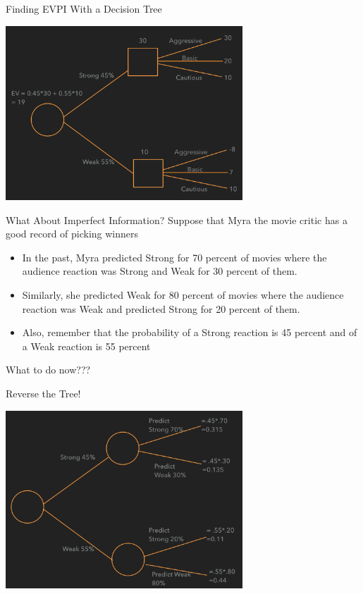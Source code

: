 \documentclass{beamer}\usepackage[]{graphicx}\usepackage[]{color}
\begin{document}
\begin{darkframes}
\begin{frame}[fragile]{Finding EVPI With a Decision Tree}
        \begin{center}
        \includegraphics[width=3.5in]{BevoPerfectInfo} 
        \end{center}
    
    \lc %
    \end{frame}  


    \begin{frame}[fragile]{What About Imperfect Information?}
      Suppose that Myra the movie critic has a good record of picking winners
      \begin{itemize} [<+->]
        \item In the past, Myra predicted Strong for 70 percent of movies where the audience reaction was Strong and Weak for 30 percent of them.
        \item Similarly, she predicted Weak for 80 percent of movies where the audience reaction was Weak and predicted Strong for 20 percent of them.
        \item Also, remember that the probability of a Strong reaction is 45 percent and of a Weak reaction is 55 percent
      \end{itemize}

      \pause
      What to do now???

      \lc %
    \end{frame}


    \begin{frame}[fragile]{Reverse the Tree!}

      \begin{center}
        \includegraphics[width=3.5in]{BeforeFlip} \\
      \end{center}


\end{frame}
\end{darkframes}
\end{document}
